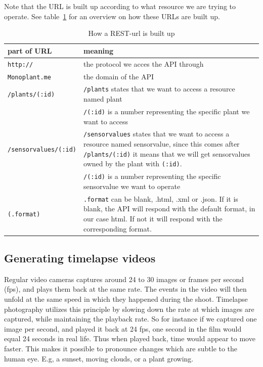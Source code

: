 Note that the URL is built up according to what resource we are trying to operate. See table~\ref{fig:RESTurl} for an overview on how these URLs are built up.

\bgroup
\def\arraystretch{1.8}	%
\begin{table}
	\centering
	\begin{tabular}{@{}lp{250pt}@{}} \toprule
		\textbf{part of URL}&	\textbf{meaning}\\ \midrule
		\texttt{http://}&	the protocol we acces the API through\\ 
		\texttt{Monoplant.me}&	the domain of the API\\ 
		\texttt{/plants/(:id)}&	\texttt{/plants} states that we want to access a resource named plant \\ &
		\texttt{/(:id)} is a number representing the specific plant we want to access\\ 
		\texttt{/sensorvalues/(:id)}&	\texttt{/sensorvalues} states that we want to access a resource named sensorvalue, since this comes after \texttt{/plants/(:id)} it means that we will get sensorvalues owned by the plant with \texttt{(:id)}. \\ &
		\texttt{/(:id)} is a number representing the specific sensorvalue we want to operate\\ 
		\texttt{(.format)}&	 \texttt{.format} can be blank, .html, .xml or .json. If it is blank, the API will respond with the default format, in our case html. If not it will respond with the corresponding format.\\ \bottomrule
	\end{tabular}
	\caption{How a REST-url is built up}
	\label{fig:RESTurl}
\end{table}
\egroup

\subsection{Generating timelapse videos}
Regular video cameras captures around 24 to 30 images or frames per second (fps), and plays them back at the same rate. The events in the video will then unfold at the same speed in which they happened during the shoot. Timelapse photography utilizes this principle by slowing down the rate at which images are captured, while maintaining the playback rate. So for instance if we captured one image per second, and played it back at 24 fps, one second in the film would equal 24 seconds in real life. Thus when played back, time would appear to move faster. This makes it possible to pronounce changes which are subtle to the human eye. E.g, a sunset, moving clouds, or a plant growing.  

